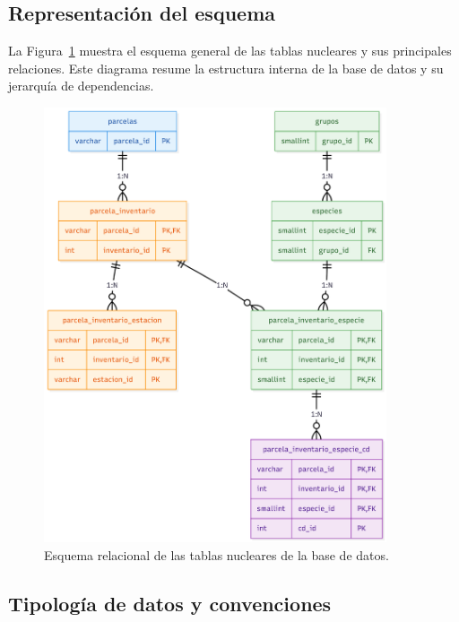 \subsection*{Representación del esquema}

La Figura~\ref{fig:GWest_BBDD} muestra el esquema general de las tablas nucleares y sus principales relaciones. Este diagrama resume la estructura interna de la base de datos y su jerarquía de dependencias.

\begin{figure}[H]
  \centering
  \includegraphics[width=0.9\textwidth]{figuras/Estrctr_BBDD_GWest.png}
  \caption{Esquema relacional de las tablas nucleares de la base de datos.}
  \label{fig:GWest_BBDD}
\end{figure}

\subsection*{Tipología de datos y convenciones}

